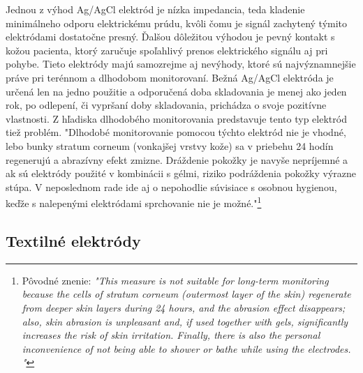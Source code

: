 Jednou z výhod Ag/AgCl elektród je nízka impedancia, teda kladenie minimálneho odporu elektrickému prúdu, kvôli čomu je signál zachytený týmito elektródami dostatočne presný. Ďalšou dôležitou výhodou je pevný kontakt s kožou pacienta, ktorý zaručuje spoľahlivý prenos elektrického signálu aj pri pohybe. Tieto elektródy majú samozrejme aj nevýhody, ktoré sú najvýznamnejšie práve pri terénnom a dlhodobom monitorovaní. Bežná Ag/AgCl elektróda je určená len na jedno použitie a odporučená doba skladovania je menej ako jeden rok, po odlepení, či vypršaní doby skladovania, prichádza o svoje pozitívne vlastnosti.\cite{Marozas2011} Z hľadiska dlhodobého monitorovania predstavuje tento typ elektród tiež problém. "Dlhodobé monitorovanie pomocou týchto elektród nie je vhodné, lebo bunky stratum corneum (vonkajšej vrstvy kože) sa v priebehu 24 hodín regenerujú a abrazívny efekt zmizne. Dráždenie pokožky je navyše nepríjemné a ak sú elektródy použité v kombinácii s gélmi, riziko podráždenia pokožky výrazne stúpa. V neposlednom rade ide aj o nepohodlie súvisiace s osobnou hygienou, keďže s nalepenými elektródami sprchovanie nie je možné."\footnote{Pôvodné znenie: \textit{"This measure is not suitable for long-term monitoring because the cells of stratum corneum (outermost layer of the skin) regenerate from deeper skin layers during 24 hours, and the abrasion effect disappears; also, skin abrasion is unpleasant and, if used together with gels, significantly increases the risk of skin irritation. Finally, there is also the personal inconvenience of not being able to shower or bathe while using the electrodes. "}}\cite{Marozas2011}

\subsection{Textilné elektródy}

